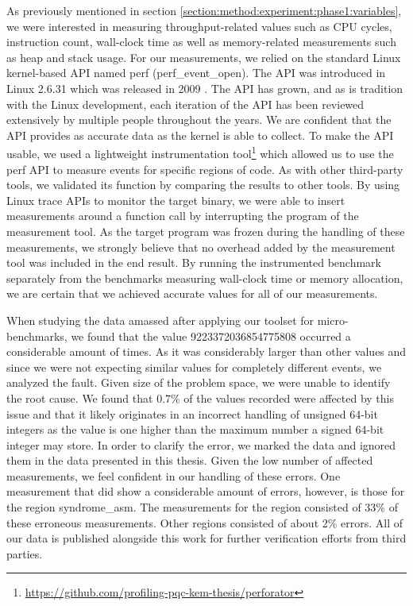 As previously mentioned in section \ref{section:method:experiment:phase1:variables}, we were interested in measuring throughput-related values such as CPU cycles, instruction count, wall-clock time as well as memory-related measurements such as heap and stack usage. For our measurements, we relied on the standard Linux kernel-based API named perf (perf\_event\_open). The API was introduced in Linux 2.6.31 which was released in 2009 \cite{linux:perf-released}. The API has grown, and as is tradition with the Linux development, each iteration of the API has been reviewed extensively by multiple people throughout the years. We are confident that the API provides as accurate data as the kernel is able to collect. To make the API usable, we used a lightweight instrumentation tool\footnote{\url{https://github.com/profiling-pqc-kem-thesis/perforator}} which allowed us to use the perf API to measure events for specific regions of code. As with other third-party tools, we validated its function by comparing the results to other tools. By using Linux trace APIs to monitor the target binary, we were able to insert measurements around a function call by interrupting the program of the measurement tool. As the target program was frozen during the handling of these measurements, we strongly believe that no overhead added by the measurement tool was included in the end result. By running the instrumented benchmark separately from the benchmarks measuring wall-clock time or memory allocation, we are certain that we achieved accurate values for all of our measurements.

When studying the data amassed after applying our toolset for micro-benchmarks, we found that the value 9223372036854775808 occurred a considerable amount of times. As it was considerably larger than other values and since we were not expecting similar values for completely different events, we analyzed the fault. Given size of the problem space, we were unable to identify the root cause. We found that 0.7\% of the values recorded were affected by this issue and that it likely originates in an incorrect handling of unsigned 64-bit integers as the value is one higher than the maximum number a signed 64-bit integer may store. In order to clarify the error, we marked the data and ignored them in the data presented in this thesis. Given the low number of affected measurements, we feel confident in our handling of these errors. One measurement that did show a considerable amount of errors, however, is those for the region syndrome\_asm. The measurements for the region consisted of 33\% of these erroneous measurements. Other regions consisted of about 2\% errors. All of our data is published alongside this work for further verification efforts from third parties.

